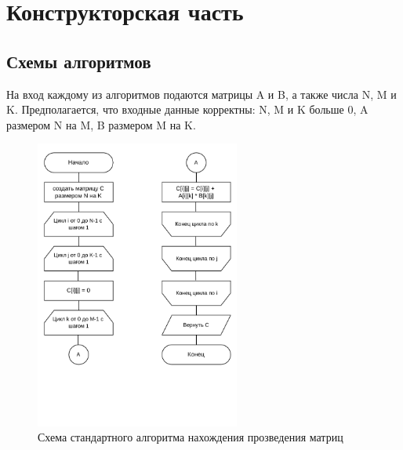 \chapter{Конструкторская часть}

\section{Схемы алгоритмов}

На вход каждому из алгоритмов подаются матрицы A и B, а также числа N, M и K. Предполагается, что входные данные корректны: N, M и K больше 0, A размером N на M, B размером M на K.

\begin{figure}[h!]
	\centering
	\includegraphics[height=0.6\textheight, width=0.6\textwidth]{tex_parts/scheme1.pdf}
	\caption{\label{fig:st}Схема стандартного алгоритма нахождения прозведения матриц}
\end{figure}

\clearpage

